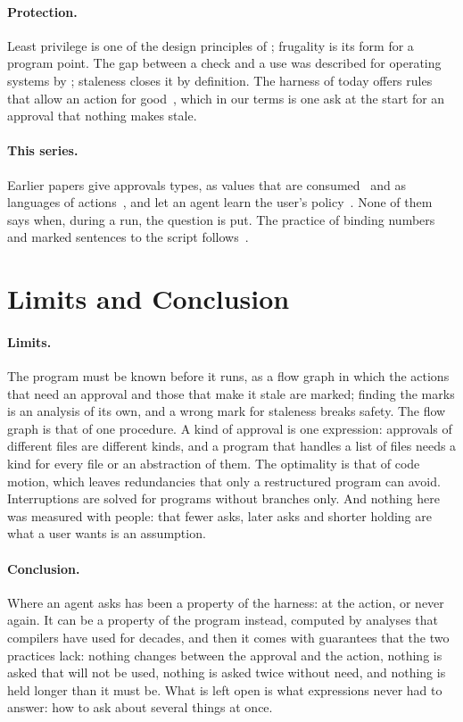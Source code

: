 \documentclass[acmsmall,nonacm,screen]{acmart}
\begin{document}
\paragraph{Protection.} Least privilege is one of the design principles of
\citet{saltzer1975}; frugality is its form for a program point. The gap between a check and
a use was described for operating systems by \citet{mcphee1974}; staleness closes it by
definition. The harness of today offers rules that allow an action for
good~\cite{claudecodepermissions}, which in our terms is one ask at the start for an
approval that nothing makes stale.

\paragraph{This series.} Earlier papers give approvals types, as values that are
consumed~\cite{tpp4} and as languages of actions~\cite{tpp11}, and let an agent learn the
user's policy~\cite{tpp16}. None of them says when, during a run, the question is put. The
practice of binding numbers and marked sentences to the script follows~\cite{tpp10}.

\section{Limits and Conclusion}
\label{sec:limits}

\paragraph{Limits.} The program must be known before it runs, as a flow graph in which the
actions that need an approval and those that make it stale are marked; finding the marks is
an analysis of its own, and a wrong mark for staleness breaks safety. The flow graph is
that of one procedure. A kind of approval is one expression: approvals of different files
are different kinds, and a program that handles a list of files needs a kind for every
file or an abstraction of them. The optimality is that of code motion, which leaves
redundancies that only a restructured program can avoid. Interruptions are solved for
programs without branches only. And nothing here was measured with people: that fewer asks,
later asks and shorter holding are what a user wants is an assumption.

\paragraph{Conclusion.} Where an agent asks has been a property of the harness: at the
action, or never again. It can be a property of the program instead, computed by analyses
that compilers have used for decades, and then it comes with guarantees that the two
practices lack: nothing changes between the approval and the action, nothing is asked that
will not be used, nothing is asked twice without need, and nothing is held longer than it
must be. What is left open is what expressions never had to answer: how to ask about
several things at once.



\end{document}
